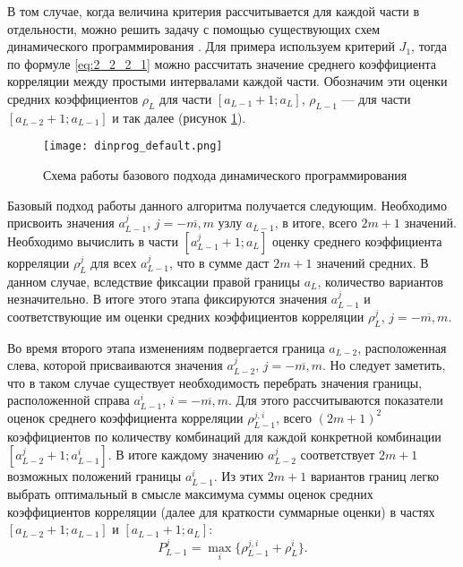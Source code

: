 В том случае, когда величина критерия рассчитывается для каждой части в отдельности, можно решить задачу с помощью существующих схем динамического программирования \cite{ventcel1980issledovanie}.
Для примера используем критерий $J_1$, тогда по формуле \eqref{eq:2_2_2_1} можно рассчитать значение среднего коэффициента корреляции между простыми интервалами каждой части.
Обозначим эти оценки средних коэффициентов $\rho_L$ для части $[a_{L-1} + 1; a_L]$, $\rho_{L-1}$ --- для части $[a_{L-2} + 1; a_{L-1}]$ и так далее (рисунок \ref{fig:dinprog_default}).

\begin{figure}[h]
	\centering
	\texttt{[image: dinprog\_default.png]}
	\caption{Схема работы базового подхода динамического программирования}
	\label{fig:dinprog_default}
\end{figure}

Базовый подход работы данного алгоритма получается следующим.
Необходимо присвоить значения $a_{L-1}^j$, $j = \overline{-m, m}$ узлу $a_{L-1}$, в итоге, всего $2m+1$ значений.
Необходимо вычислить в части $[a_{L-1}^j + 1; a_L]$ оценку среднего коэффициента корреляции $\rho_L^j$ для всех $a_{L-1}^j$, что в сумме даст $2m + 1$ значений средних.
В данном случае, вследствие фиксации правой границы $a_L$, количество вариантов незначительно.
В итоге этого этапа фиксируются значения $a_{L-1}^j$ и соответствующие им оценки средних коэффициентов корреляции $\rho_L^j$, $j = \overline{-m, m}$.

Во время второго этапа изменениям подвергается граница $a_{L-2}$, расположенная слева, которой присваиваются значения $a_{L-2}^j$, $j = \overline{-m, m}$.
Но следует заметить, что в таком случае существует необходимость перебрать значения границы, расположенной справа $a_{L-1}^i$, $i = \overline{-m, m}$.
Для этого рассчитываются показатели оценок среднего коэффициента корреляции $\rho_{L-1}^{j, i}$, всего $(2m + 1)^2$ коэффициентов по количеству комбинаций для каждой конкретной комбинации $[a_{L-2}^j + 1; a_{L-1}^i]$.
В итоге каждому значению $a_{L-2}^j$ соответствует $2m + 1$ возможных положений границы $a_{L-1}^i$.
Из этих $2m + 1$ вариантов границ легко выбрать оптимальный в смысле максимума суммы оценок средних коэффициентов корреляции (далее для краткости суммарные оценки) в частях $[a_{L-2} + 1; a_{L-1}]$ и $[a_{L-1} + 1; a_L]$:
\begin{equation}
P_{L-1}^j = \max_{i} \{\rho_{L-1}^{j, i} + \rho_L^i \}.
\end{equation}

